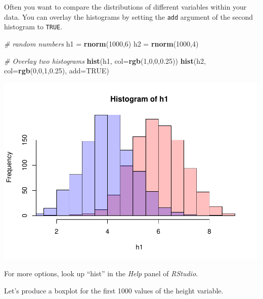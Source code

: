 \documentclass[
]{book}
\newenvironment{Shaded}{\begin{snugshade}}{\end{snugshade}}
\newcommand{\CommentTok}[1]{\textcolor[rgb]{0.56,0.35,0.01}{\textit{#1}}}
\newcommand{\DataTypeTok}[1]{\textcolor[rgb]{0.13,0.29,0.53}{#1}}
\newcommand{\DecValTok}[1]{\textcolor[rgb]{0.00,0.00,0.81}{#1}}
\newcommand{\FloatTok}[1]{\textcolor[rgb]{0.00,0.00,0.81}{#1}}
\newcommand{\KeywordTok}[1]{\textcolor[rgb]{0.13,0.29,0.53}{\textbf{#1}}}
\newcommand{\NormalTok}[1]{#1}
\newcommand{\OperatorTok}[1]{\textcolor[rgb]{0.81,0.36,0.00}{\textbf{#1}}}
\newcommand{\OtherTok}[1]{\textcolor[rgb]{0.56,0.35,0.01}{#1}}
\newcommand{\StringTok}[1]{\textcolor[rgb]{0.31,0.60,0.02}{#1}}
\begin{document}
Often you want to compare the distributions of different variables within your data. You can overlay the histograms by setting the \texttt{add} argument of the second histogram to \texttt{TRUE}.

\begin{Shaded}
\begin{Highlighting}[]
\CommentTok{# random numbers}
\NormalTok{h1 =}\StringTok{ }\KeywordTok{rnorm}\NormalTok{(}\DecValTok{1000}\NormalTok{,}\DecValTok{6}\NormalTok{)}
\NormalTok{h2 =}\StringTok{ }\KeywordTok{rnorm}\NormalTok{(}\DecValTok{1000}\NormalTok{,}\DecValTok{4}\NormalTok{)}

\CommentTok{# Overlay two histograms}
\KeywordTok{hist}\NormalTok{(h1,}
     \DataTypeTok{col=}\KeywordTok{rgb}\NormalTok{(}\DecValTok{1}\NormalTok{,}\DecValTok{0}\NormalTok{,}\DecValTok{0}\NormalTok{,}\FloatTok{0.25}\NormalTok{))}
\KeywordTok{hist}\NormalTok{(h2,}
     \DataTypeTok{col=}\KeywordTok{rgb}\NormalTok{(}\DecValTok{0}\NormalTok{,}\DecValTok{0}\NormalTok{,}\DecValTok{1}\NormalTok{,}\FloatTok{0.25}\NormalTok{),}
     \DataTypeTok{add=}\OtherTok{TRUE}\NormalTok{)}
\end{Highlighting}
\end{Shaded}

\includegraphics{_main_files/figure-latex/unnamed-chunk-132-1.pdf}

For more options, look up ``hist'' in the \emph{Help} panel of \emph{RStudio}.

Let's produce a boxplot for the first 1000 values of the height variable.

\begin{Shaded}
\end{Shaded}
\end{document}
